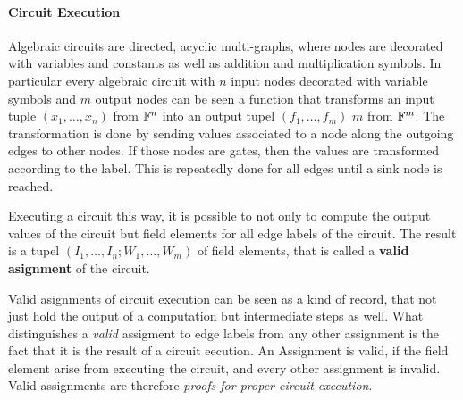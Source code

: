 \paragraph{Circuit Execution} Algebraic circuits are directed, acyclic multi-graphs, where nodes are decorated with variables and constants as well as addition and multiplication symbols. In particular every algebraic circuit with $n$ input nodes decorated with variable symbols and $m$ output nodes can be seen a function that transforms an input tuple $(x_1,\ldots, x_n)$ from $\mathbb{F}^n$ into an output tupel $(f_1,\ldots,f_m)$ $m$ from $\mathbb{F}^m$. The transformation is done by sending values associated to a node along the outgoing edges to other nodes. If those nodes are gates, then the values are transformed according to the label. This is repeatedly done for all edges until a sink node is reached.

Executing a circuit this way, it is possible to not only to compute the output values of the circuit but field elements for all edge labels of the circuit. The result is a tupel $(I_1,\ldots,I_n; W_1,\ldots,W_m)$ of field elements, that is called a \textbf{valid asignment} of the circuit. 

Valid asignments of circuit execution can be seen as a kind of record, that not just hold the output of a computation but intermediate steps as well. What distinguishes a \textit{valid} assigment to edge labels from any other assignment is the fact that it is the result of a circuit eecution. An Assignment is valid, if the field element arise from executing the circuit, and every other assignment is invalid. Valid assignments are therefore \textit{proofs for proper circuit execution}.

